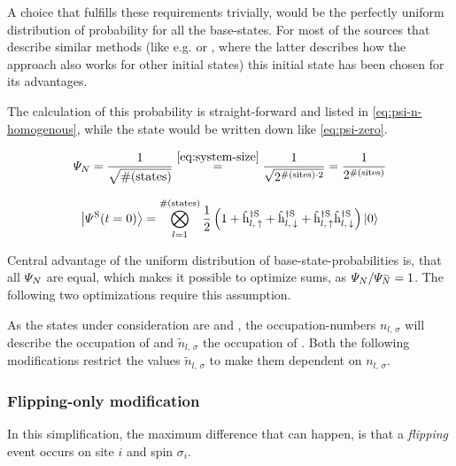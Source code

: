 A choice that fulfills these requirements trivially, would be the perfectly uniform distribution of probability for all the base-states.
For most of the sources that describe similar methods (like e.g. \cite{isingDynamicsWithClassicalNetworks} or \cite{variationalClassicalNetworksPaper}, where the latter describes how the approach also works for other initial states) this initial state has been chosen for its advantages.

The calculation of this probability is straight-forward and listed in \autoref{eq:psi-n-homogenous}, while the state would be written down like \autoref{eq:psi-zero}.

\begin{equation}
    \label{eq:psi-n-homogenous}
    \psiN{} = \frac{1}{\sqrt{\text{\#}(\text{states})}} \stackrel{\ref{eq:system-size}}{=} \frac{1}{\sqrt{2^{\text{\#}(\text{sites}) \cdot 2}}} = \frac{1}{2^{\text{\#}(\text{sites})}}
\end{equation}

\begin{equation}
    \label{eq:psi-zero}
    \ketpsiof[\schroedingerPicture]{t=0} = \bigotimes\limits_{l=1}^{\text{\#}(\text{states})} \frac{1}{2} \left( 1 + \withspinhcop[\schroedingerPicture]{l}{\up}{\dagger} + \withspinhcop[\schroedingerPicture]{l}{\down}{\dagger} + \withspinhcop[\schroedingerPicture]{l}{\up}{\dagger}  \withspinhcop[\schroedingerPicture]{l}{\down}{\dagger} \right) \ketN[0]
\end{equation}

Central advantage of the uniform distribution of base-state-probabilities is, that all $\varPsi_{N}$ are equal, which makes it possible to optimize sums, as $\psiN{}/\psiN[\vphantom{N}\smash{\tilde{N}}]{} = 1$.
The following two optimizations require this assumption.

As the states under consideration are \ketN[N] and , the occupation-numbers $n_{l,\,\sigma}$ will describe the occupation of \ketN[N] and $\tilde{n}_{l,\,\sigma}$ the occupation of .
Both the following modifications restrict the values $\tilde{n}_{l,\,\sigma}$ to make them dependent on $n_{l,\,\sigma}$.


\subsubsection*{Flipping-only modification}

In this simplification, the maximum difference that can happen, is that a \emph{flipping} event occurs on site $i$ and spin $\sigma_i$. 

